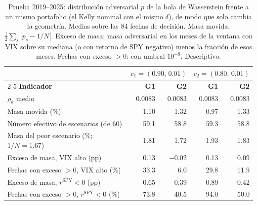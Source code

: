 \begin{table}[h]
\centering
\footnotesize
\setlength{\tabcolsep}{4pt}
\caption{Prueba 2019--2025: distribución adversarial $p$ de la bola de Wasserstein frente a un mismo portafolio (el Kelly nominal con el mismo $\delta$), de modo que solo cambia la geometría. Medias sobre las 84 fechas de decisión. Masa movida: $\frac12\sum_s|p_s-1/N|$. Exceso de masa: masa adversarial en los meses de la ventana con VIX sobre su mediana (o con retorno de SPY negativo) menos la fracción de esos meses. Fechas con exceso $>0$: con umbral $10^{-8}$. Descriptivo.}\label{tab:adversarial}
\begin{tabular}{|l|r|r|r|r|}
\hline
 & \multicolumn{2}{c|}{\textbf{$c_1=(0.90,\,0.01)$}} & \multicolumn{2}{c|}{\textbf{$c_2=(0.80,\,0.01)$}} \\ \cline{2-5}
\textbf{Indicador} & \textbf{G1} & \textbf{G2} & \textbf{G1} & \textbf{G2} \\ \hline
$\rho_k$ medio & 0.0083 & 0.0083 & 0.0083 & 0.0083 \\ \hline
Masa movida (\%) & 1.10 & 1.32 & 0.97 & 1.33 \\ \hline
Número efectivo de escenarios (de 60) & 59.1 & 58.8 & 59.3 & 58.8 \\ \hline
Masa del peor escenario (\%; $1/N=1.67$) & 1.81 & 1.72 & 1.93 & 1.83 \\ \hline
Exceso de masa, VIX alto (pp) & 0.13 & $-$0.02 & 0.13 & 0.09 \\ \hline
Fechas con exceso $>0$, VIX alto (\%) & 33.3 & 6.0 & 29.8 & 11.9 \\ \hline
Exceso de masa, $r^{\mathrm{SPY}}<0$ (pp) & 0.65 & 0.39 & 0.89 & 0.42 \\ \hline
Fechas con exceso $>0$, $r^{\mathrm{SPY}}<0$ (\%) & 73.8 & 40.5 & 94.0 & 50.0 \\ \hline
\end{tabular}
\end{table}

